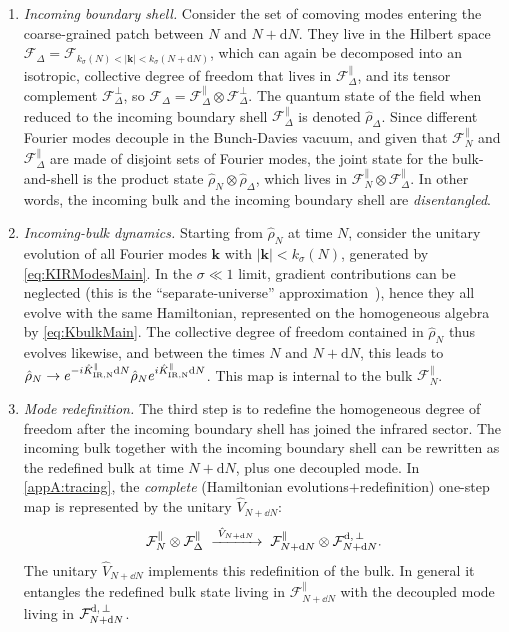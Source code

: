 \documentclass{article}
\numberwithin{equation}{section}
\begin{document}
		\begin{enumerate}

			\item \textit{Incoming boundary shell.} Consider the set of comoving modes entering the coarse-grained patch between $N$ and $N+\mathrm{d}N$. They live in the Hilbert space $\mathcal{F}_\Delta = \mathcal{F}_{k_\sigma(N)<|\bm{k}| <  k_\sigma(N+\mathrm{d}N)}$, which can again be decomposed into an isotropic, collective degree of freedom that lives in $\mathcal{F}_\Delta^\parallel$, and its tensor complement  $\mathcal{F}_\Delta^\perp$, so  $\mathcal{F}_\Delta =\mathcal{F}_\Delta^\parallel \otimes \mathcal{F}_\Delta^\perp$. The quantum state of the field when reduced to the incoming boundary shell $\mathcal{F}_\Delta^\parallel$ is denoted $\hat{\rho}_\Delta$. Since different Fourier modes decouple in the Bunch-Davies vacuum, and given that $\mathcal{F}_N^\parallel$ and $\mathcal{F}_\Delta^\parallel$ are made of disjoint sets of Fourier modes, the joint state for the bulk-and-shell is the product state $\hat{\rho}_N\otimes\hat{\rho}_\Delta$, which lives in $\mathcal{F}_N^\parallel \otimes \mathcal{F}_\Delta^\parallel$. In other words, the incoming bulk and the incoming boundary shell are \textit{disentangled}.


			\item \textit{Incoming-bulk dynamics.} Starting from $\hat{\rho}_N$ at time $N$, consider the unitary evolution of all Fourier  modes $\bm{k}$ with $\vert\bm{k}\vert<k_\sigma(N)$, generated by \cref{eq:KIRModesMain}. In the $\sigma\ll 1$ limit, gradient contributions can be neglected (this is the ``separate-universe'' approximation~\cite{Salopek:1990, Sasaki:1995, Wands:2000, Lyth:2003, Rigopoulos:2003, Lyth:2005}), hence they all evolve with the same Hamiltonian, represented on the homogeneous algebra by \cref{eq:KbulkMain}.
			The collective degree of freedom contained in  $\hat{\rho}_N$ thus evolves likewise, and between the times $N$ and $N+\mathrm{d}N$, this leads to $\hat{\rho}_N\to e^{-i\hat K_{\rm IR, N}^{\parallel}\mathrm{d}N}\hat{\rho}_N e^{i\hat K_{\rm IR, N}^{\parallel}\mathrm{d}N}$. This map is internal to the bulk $\mathcal{F}_N^\parallel$.


			\item \textit{Mode redefinition.} The  third step is to redefine the homogeneous degree of freedom after the incoming boundary shell has joined the infrared sector. The incoming bulk together with the incoming boundary shell can be rewritten as the redefined bulk at time \(N+\mathrm{d}N\), plus one decoupled mode. In \cref{appA:tracing}, the \textit{complete} (Hamiltonian evolutions$+$redefinition) one-step map is represented by the unitary \(\hat V_{N+\dd N}\):
			\[
			\mathcal F_N^\parallel\otimes\mathcal F_\Delta^\parallel
			\;\xrightarrow{\;\hat V_{N+\dd N}\;}\;
			\mathcal F_{N+\dd N}^\parallel
			\otimes
			\mathcal F^{\rm d,\, \perp}_{N+\dd N}.
			\]
			The unitary \(\hat V_{N+\dd N}\) implements this redefinition of the bulk. In general it entangles the redefined bulk state living in \(\mathcal F_{N+\dd N}^\parallel\) with the decoupled mode living in \(\mathcal F^{\rm d,\, \perp}_{N+\dd N}\).


\end{enumerate}
\end{document}
